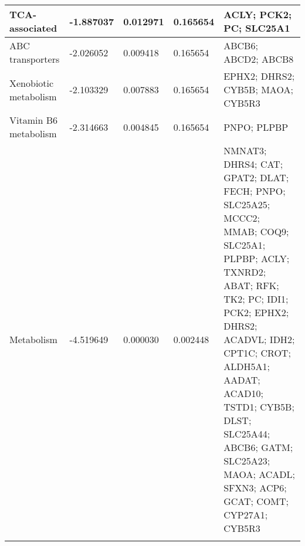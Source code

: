\begin{longtable}{p{5cm} p{2cm} p{1.5cm} p{1.5cm} p{7cm}}
    \hline
    TCA-associated & -1.887037 & 0.012971 & 0.165654 & ACLY; PCK2; PC; SLC25A1 \\
    \hline
    ABC transporters & -2.026052 & 0.009418 & 0.165654 & ABCB6; ABCD2; ABCB8 \\
    \hline
    Xenobiotic metabolism & -2.103329 & 0.007883 & 0.165654 & EPHX2; DHRS2; CYB5B; MAOA; CYB5R3 \\
    \hline
    Vitamin B6 metabolism & -2.314663 & 0.004845 & 0.165654 & PNPO; PLPBP \\
    \hline
    Metabolism & -4.519649 & 0.000030 & 0.002448 & NMNAT3; DHRS4; CAT; GPAT2; DLAT; FECH; PNPO; SLC25A25; MCCC2; MMAB; COQ9; SLC25A1; PLPBP; ACLY; TXNRD2; ABAT; RFK; TK2; PC; IDI1; PCK2; EPHX2; DHRS2; ACADVL; IDH2; CPT1C; CROT; ALDH5A1; AADAT; ACAD10; TSTD1; CYB5B; DLST; SLC25A44; ABCB6; GATM; SLC25A23; MAOA; ACADL; SFXN3; ACP6; GCAT; COMT; CYP27A1; CYB5R3 \\
    \label{tab:y622_mito_genes}
\end{longtable}

